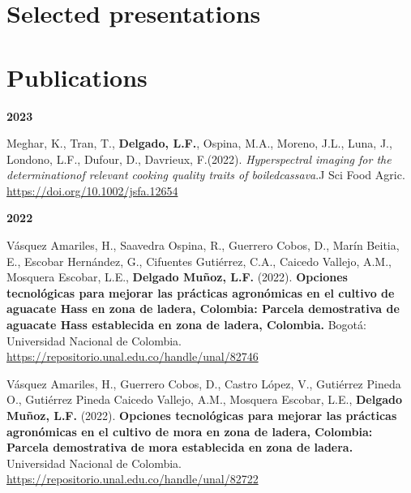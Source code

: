 \documentclass[11pt,a4paper,]{awesome-cv}
\begin{document}
\hypertarget{selected-presentations}{%
\section{Selected presentations}\label{selected-presentations}}

\begin{cvhonors}
\end{cvhonors}

\hypertarget{publications}{%
\section{Publications}\label{publications}}

\footnotesize

\setlength{\leftskip}{0cm}

\textbf{2023}

\setlength{\leftskip}{1cm}

Meghar, K., Tran, T., \textbf{Delgado, L.F.}, Ospina, M.A., Moreno,
J.L., Luna, J., Londono, L.F., Dufour, D., Davrieux, F.(2022).
\emph{Hyperspectral imaging for the determinationof relevant cooking
quality traits of boiledcassava}.J Sci Food Agric.
\url{https://doi.org/10.1002/jsfa.12654}

\setlength{\leftskip}{0cm}

\textbf{2022}

\setlength{\leftskip}{1cm}

Vásquez Amariles, H., Saavedra Ospina, R., Guerrero Cobos, D., Marín
Beitia, E., Escobar Hernández, G., Cifuentes Gutiérrez, C.A., Caicedo
Vallejo, A.M., Mosquera Escobar, L.E., \textbf{Delgado Muñoz, L.F.}
(2022). \textbf{Opciones tecnológicas para mejorar las prácticas
agronómicas en el cultivo de aguacate Hass en zona de ladera, Colombia:
Parcela demostrativa de aguacate Hass establecida en zona de ladera,
Colombia.} Bogotá: Universidad Nacional de Colombia.
\url{https://repositorio.unal.edu.co/handle/unal/82746}

Vásquez Amariles, H., Guerrero Cobos, D., Castro López, V., Gutiérrez
Pineda O., Gutiérrez Pineda Caicedo Vallejo, A.M., Mosquera Escobar,
L.E., \textbf{Delgado Muñoz, L.F.} (2022). \textbf{Opciones tecnológicas
para mejorar las prácticas agronómicas en el cultivo de mora en zona de
ladera, Colombia: Parcela demostrativa de mora establecida en zona de
ladera.} Universidad Nacional de Colombia.
\url{https://repositorio.unal.edu.co/handle/unal/82722}
\end{document}
